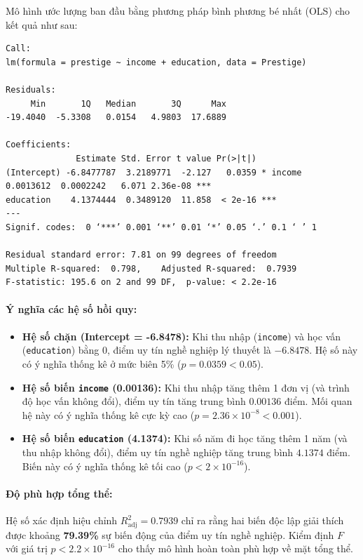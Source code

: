 	Mô hình ước lượng ban đầu bằng phương pháp bình phương bé nhất (OLS) cho kết quả như sau:
\begin{verbatim}
Call:
lm(formula = prestige ~ income + education, data = Prestige)

Residuals:
     Min       1Q   Median       3Q      Max 
-19.4040  -5.3308   0.0154   4.9803  17.6889 

Coefficients:
              Estimate Std. Error t value Pr(>|t|)    
(Intercept) -6.8477787  3.2189771  -2.127   0.0359 * income       0.0013612  0.0002242   6.071 2.36e-08 ***
education    4.1374444  0.3489120  11.858  < 2e-16 ***
---
Signif. codes:  0 ‘***’ 0.001 ‘**’ 0.01 ‘*’ 0.05 ‘.’ 0.1 ‘ ’ 1

Residual standard error: 7.81 on 99 degrees of freedom
Multiple R-squared:  0.798,    Adjusted R-squared:  0.7939 
F-statistic: 195.6 on 2 and 99 DF,  p-value: < 2.2e-16
\end{verbatim}

	\paragraph{Ý nghĩa các hệ số hồi quy:}
	\begin{itemize}
		\item \textbf{Hệ số chặn (Intercept = -6.8478):} Khi thu nhập (\texttt{income}) và học vấn (\texttt{education}) bằng 0, điểm uy tín nghề nghiệp lý thuyết là $-6.8478$. Hệ số này có ý nghĩa thống kê ở mức biên 5\% ($p = 0.0359 < 0.05$).
		\item \textbf{Hệ số biến \texttt{income} (0.00136):} Khi thu nhập tăng thêm 1 đơn vị (và trình độ học vấn không đổi), điểm uy tín tăng trung bình $0.00136$ điểm. Mối quan hệ này có ý nghĩa thống kê cực kỳ cao ($p = 2.36 \times 10^{-8} < 0.001$).
		\item \textbf{Hệ số biến \texttt{education} (4.1374):} Khi số năm đi học tăng thêm 1 năm (và thu nhập không đổi), điểm uy tín nghề nghiệp tăng trung bình $4.1374$ điểm. Biến này có ý nghĩa thống kê tối cao ($p < 2 \times 10^{-16}$).
	\end{itemize}

	\paragraph{Độ phù hợp tổng thể:} Hệ số xác định hiệu chỉnh $R^2_{\text{adj}} = 0.7939$ chỉ ra rằng hai biến độc lập giải thích được khoảng \textbf{79.39\%} sự biến động của điểm uy tín nghề nghiệp. Kiểm định $F$ với giá trị $p < 2.2 \times 10^{-16}$ cho thấy mô hình hoàn toàn phù hợp về mặt tổng thể.

